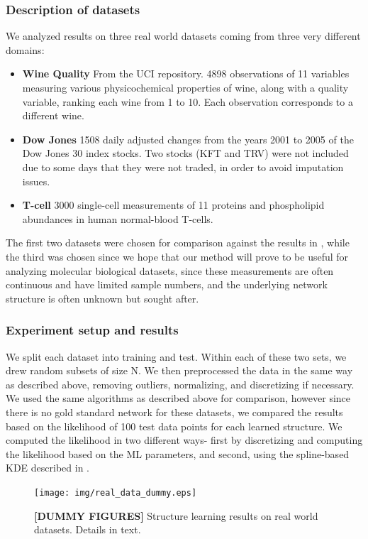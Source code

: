 \documentclass{article} %
\begin{document}
\subsubsection{Description of datasets}
We analyzed results on three real world datasets coming from three very different domains:
\begin{itemize}
\item{\bf Wine Quality} From the UCI repository.  4898 observations of 11 variables measuring various physicochemical properties of wine, along with a quality variable, ranking each wine from 1 to 10. Each observation corresponds to a different wine.  \cite{cortez2009modeling}
\item{\bf Dow Jones} 1508 daily adjusted changes from the years 2001 to 2005 of the Dow Jones 30 index stocks.  Two stocks (KFT and TRV) were not included due to some days that they were not traded, in order to avoid imputation issues.
\item{\bf T-cell} 3000 single-cell measurements of 11 proteins and phospholipid abundances in human normal-blood T-cells. \cite{sachs2005causal}
\end{itemize}
The first two datasets were chosen for comparison against the results in \cite{elidan2012lightning}, while the third was chosen since we hope that our method will prove to be useful for analyzing molecular biological datasets, since these measurements are often continuous and have limited sample numbers, and the underlying network structure is often unknown but sought after.

\subsubsection{Experiment setup and results}
We split each dataset into training and test.  Within each of these two sets, we drew random subsets of size N.  We then preprocessed the data in the same way as described above, removing outliers, normalizing, and discretizing if necessary.  We used the same algorithms as described above for comparison, however since there is no gold standard network for these datasets, we compared the results based on the likelihood of 100 test data points for each learned structure.  We computed the likelihood in two different ways- first by discretizing and computing the likelihood based on the ML parameters, and second, using the spline-based KDE described in \cite{gurwicz2004rapid}. 

\begin{figure}[h]
\centering
\texttt{[image: img/real\_data\_dummy.eps]} 
\caption{{\bf[DUMMY FIGURES]} Structure learning results on real world datasets.  Details in text.}
\label{fig:real}
\end{figure}
\end{document}
